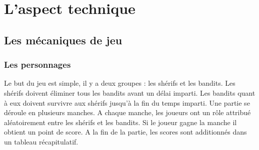 \documentclass[12pt]{report}
\begin{document}

    \chapter{L'aspect technique} 
        \section{Les mécaniques de jeu}
            \subsection{Les personnages}
                Le but du jeu est simple, il y a deux groupes : les shérifs et les bandits. Les shérifs doivent éliminer tous les bandits avant un délai imparti. Les bandits quant à eux doivent survivre aux shérifs jusqu'à la fin du temps imparti.
                Une partie se déroule en plusieurs manches. A chaque manche, les joueurs ont un rôle attribué aléatoirement entre les shérifs et les bandits. Si le joueur gagne la manche il obtient un point de score. A la fin de la partie, les scores sont additionnés dans un tableau récapitulatif.
\end{document}
